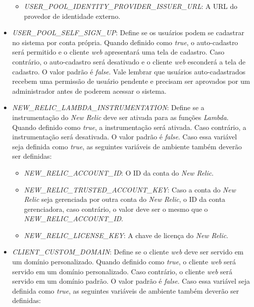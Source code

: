 \begin{itemize}
\begin{itemize}
        \item \textit{USER\_POOL\_IDENTITY\_PROVIDER\_ISSUER\_URL}: A URL do provedor de identidade externo.
    \end{itemize}

    \item \textit{USER\_POOL\_SELF\_SIGN\_UP}: Define se os usuários podem se cadastrar no sistema por conta própria. Quando definido como \textit{true}, o auto-cadastro será permitido e o cliente \textit{web} apresentará uma tela de cadastro. Caso contrário, o auto-cadastro será desativado e o cliente \textit{web} esconderá a tela de cadastro. O valor padrão é \textit{false}. Vale lembrar que usuários auto-cadastrados recebem uma permissão de usuário pendente e precisam ser aprovados por um administrador antes de poderem acessar o sistema.

    \item \textit{NEW\_RELIC\_LAMBDA\_INSTRUMENTATION}: Define se a instrumentação do \textit{New Relic} deve ser ativada para as funções \textit{Lambda}. Quando definido como \textit{true}, a instrumentação será ativada. Caso contrário, a instrumentação será desativada. O valor padrão é \textit{false}. Caso essa variável seja definida como \textit{true}, as seguintes variáveis de ambiente também deverão ser definidas:

    \begin{itemize}

        \item \textit{NEW\_RELIC\_ACCOUNT\_ID}: O ID da conta do \textit{New Relic}.

        \item \textit{NEW\_RELIC\_TRUSTED\_ACCOUNT\_KEY}: Caso a conta do \textit{New Relic} seja gerenciada por outra conta do \textit{New Relic}, o ID da conta gerenciadora, caso contrário, o valor deve ser o mesmo que o \textit{NEW\_RELIC\_ACCOUNT\_ID}.

        \item \textit{NEW\_RELIC\_LICENSE\_KEY}: A chave de licença do \textit{New Relic}.

    \end{itemize}

    \item \textit{CLIENT\_CUSTOM\_DOMAIN}: Define se o cliente \textit{web} deve ser servido em um domínio personalizado. Quando definido como \textit{true}, o cliente \textit{web} será servido em um domínio personalizado. Caso contrário, o cliente \textit{web} será servido em um domínio padrão. O valor padrão é \textit{false}. Caso essa variável seja definida como \textit{true}, as seguintes variáveis de ambiente também deverão ser definidas:


\end{itemize}
